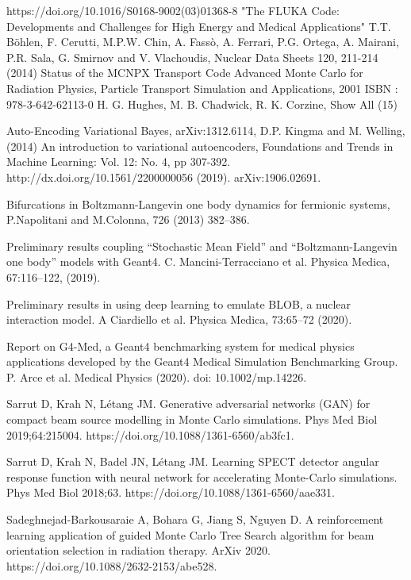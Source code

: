 \begin{thebibliography}{99}
 https://doi.org/10.1016/S0168-9002(03)01368-8
 "The FLUKA Code: Developments and Challenges for High Energy and Medical Applications" T.T. Böhlen, F. Cerutti, M.P.W. Chin, A. Fassò, A. Ferrari, P.G. Ortega, A. Mairani, P.R. Sala, G. Smirnov and V. Vlachoudis, Nuclear Data Sheets 120, 211-214 (2014)
 Status of the MCNPX Transport Code Advanced Monte Carlo for Radiation Physics, Particle Transport Simulation and Applications, 2001 ISBN : 978-3-642-62113-0 H. G. Hughes, M. B. Chadwick, R. K. Corzine, Show All (15)

 Auto-Encoding Variational Bayes, arXiv:1312.6114, D.P. Kingma and M. Welling, (2014)
 An introduction to variational autoencoders, Foundations and Trends in Machine Learning: Vol. 12: No. 4, pp 307-392. http://dx.doi.org/10.1561/2200000056 (2019). arXiv:1906.02691.

 Bifurcations in Boltzmann-Langevin one body dynamics for fermionic systems, P.Napolitani and M.Colonna, 726 (2013) 382–386.

 Preliminary results coupling “Stochastic Mean Field” and “Boltzmann-Langevin one body” models with Geant4. C. Mancini-Terracciano et al. Physica Medica, 67:116–122, (2019).

 Preliminary results in using deep
learning to emulate BLOB, a nuclear interaction model. A Ciardiello et al. Physica Medica, 73:65–72 (2020).

 Report on G4-Med, a Geant4 benchmarking system for medical physics applications developed by the Geant4 Medical Simulation Benchmarking Group. P. Arce et al. Medical Physics (2020). doi: 10.1002/mp.14226.


Sarrut D, Krah N, Létang JM. Generative adversarial networks (GAN) for compact beam source modelling in Monte Carlo simulations. Phys Med Biol 2019;64:215004. https://doi.org/10.1088/1361-6560/ab3fc1.

Sarrut D, Krah N, Badel JN, Létang JM. Learning SPECT detector angular response function with neural network for accelerating Monte-Carlo simulations. Phys Med Biol 2018;63. https://doi.org/10.1088/1361-6560/aae331.


Sadeghnejad-Barkousaraie A, Bohara G, Jiang S, Nguyen D. A reinforcement learning application of guided Monte Carlo Tree Search algorithm for beam orientation selection in radiation therapy. ArXiv 2020. https://doi.org/10.1088/2632-2153/abe528.


\end{thebibliography}
